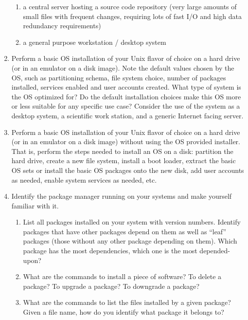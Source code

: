\begin{enumerate}
\begin{enumerate}
\item
a central server hosting a source code repository (very large amounts of
small files with frequent changes, requiring lots of fast I/O and high
data redundancy requirements)

\item
a general purpose workstation / desktop system
\end{enumerate}

\item
\label{prob:software-installation:os-installation}
Perform a basic OS installation of your Unix flavor of choice on a hard
drive (or in an emulator on a disk image).  Note the default values chosen
by the OS, such as partitioning schema, file system choice, number of
packages installed, services enabled and user accounts created.  What type
of system is the OS optimized for?  Do the default installation choices
make this OS more or less suitable for any specific use case?  Consider
the use of the system as a desktop system, a scientific work station, and
a generic Internet facing server.

\item
\label{prob:software-installation:os-installation:manual}
Perform a basic OS installation of your Unix flavor of choice on a hard
drive (or in an emulator on a disk image) without using the OS provided
installer.  That is, perform the steps needed to install an OS on a disk:
partition the hard drive, create a new file system, install a boot loader,
extract the basic OS sets or install the basic OS packages onto the new
disk, add user accounts as needed, enable system services as needed, etc.

\item
Identify the package manager running on your systems and make yourself
familiar with it.

\begin{enumerate}
\item
List all packages installed on your system with version numbers.  Identify
packages that have other packages depend on them as well as ``leaf'' packages
(those without any other package depending on them).  Which package has
the most dependencies, which one is the most depended-upon?

\item
What are the commands to install a piece of software?  To delete a
package?  To upgrade a package?  To downgrade a package?

\item
What are the commands to list the files installed by a given package?
Given a file name, how do you identify what package it belongs to?
\end{enumerate}


\end{enumerate}
